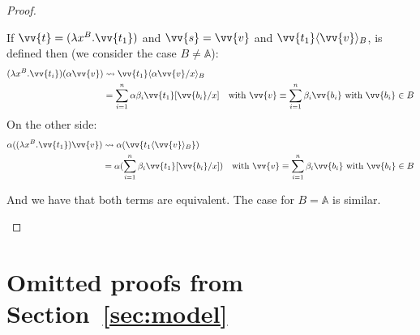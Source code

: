 \documentclass[runningheads,orivec,envcountsame,envcountsect]{llncs}
\newcommand\ansubst[2]{\ensuremath{\langle #1 \rangle_{#2}}}
\newcommand\AbsBasis{\ensuremath{\mathbb{A}}}
\def\Lam#1#2#3{\lambda#1^{#2}{.}#3} %
\def\lraneq{\rightsquigarrow}
\begin{document}
\begin{proof}
\begin{description}
    If $\vv{t} = (\Lam{x}{B}{\vv{t_1}})$ and $\vv{s}=\vv{v}$ and $\vv{t_1}\ansubst{\vv{v}}{B}$, is defined then (we consider the case $B\neq\AbsBasis$):
    \begin{align*}
      (\Lam{x}{B}{\vv{t_i}}) (\alpha\vv{v}) &\lraneq \vv{t_1}\ansubst{\alpha\vv{v}/x}{B}\\
      &= \sum_{i=1}^{n} \alpha\beta_i \vv{t_1}[\vv{b_i}/x]\quad \text{with }\vv{v}\equiv\sum_{i=1}^{n} \beta_i \vv{b_i} \text{ with } \vv{b_i}\in B\\
    \end{align*}
    On the other side:
    \begin{align*}
      \alpha ((\Lam{x}{B}{\vv{t_1}}) \vv{v}) &\lraneq \alpha(\vv{t_1\ansubst{\vv{v}}{B}})\\
      &=\alpha(\sum_{i=1}^{n} \beta_i \vv{t_1}[\vv{b_i}/x])\quad \text{with }\vv{v}\equiv\sum_{i=1}^{n} \beta_i \vv{b_i} \text{ with } \vv{b_i}\in B\\
    \end{align*}

    And we have that both terms are equivalent. The case for $B=\AbsBasis$ is similar.
    
  \end{description}
\end{proof}

\section{Omitted proofs from Section~\ref{sec:model}}\label{sec:appendixC}
\end{document}
